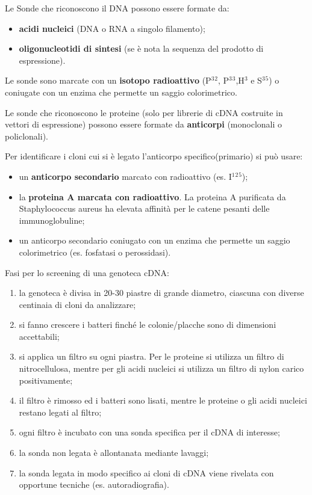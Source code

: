 \documentclass[11pt]{book}
\begin{document}
Le Sonde che riconoscono il DNA possono essere formate da:

\begin{itemize}
\itemsep1pt\parskip0pt
\item
  \textbf{acidi nucleici} (DNA o RNA a singolo filamento);
\item
  \textbf{oligonucleotidi di sintesi} (se è nota la sequenza del
  prodotto di espressione).
\end{itemize}

Le sonde sono marcate con un \textbf{isotopo radioattivo}
(P\(^3\)\(^2\), P\(^3\)\(^3\),H\(^3\) e S\(^3\)\(^5\)) o coniugate con
un enzima che permette un saggio colorimetrico.

Le sonde che riconoscono le proteine (solo per librerie di cDNA
costruite in vettori di espressione) possono essere formate da
\textbf{anticorpi} (monoclonali o policlonali).

Per identificare i cloni cui si è legato l'anticorpo specifico(primario)
si può usare:

\begin{itemize}
\itemsep1pt\parskip0pt
\item
  un \textbf{anticorpo secondario} marcato con radioattivo (es.
  I\(^1\)\(^2\)\(^5\));
\item
  la \textbf{proteina A marcata con radioattivo}. La proteina A
  purificata da Staphylococcus aureus ha elevata affinità per le catene
  pesanti delle immunoglobuline;
\item
  un anticorpo secondario coniugato con un enzima che permette un saggio
  colorimetrico (es. fosfatasi o perossidasi).
\end{itemize}

Fasi per lo screening di una genoteca cDNA:

\begin{enumerate}
\def\labelenumi{\arabic{enumi}.}
\itemsep1pt\parskip0pt
\item
  la genoteca è divisa in 20-30 piastre di grande diametro, ciascuna con
  diverse centinaia di cloni da analizzare;
\item
  si fanno crescere i batteri finché le colonie/placche sono di
  dimensioni accettabili;
\item
  si applica un filtro su ogni piastra. Per le proteine si utilizza un
  filtro di nitrocellulosa, mentre per gli acidi nucleici si utilizza un
  filtro di nylon carico positivamente;
\item
  il filtro è rimosso ed i batteri sono lisati, mentre le proteine o gli
  acidi nucleici restano legati al filtro;
\item
  ogni filtro è incubato con una sonda specifica per il cDNA di
  interesse;
\item
  la sonda non legata è allontanata mediante lavaggi;
\item
  la sonda legata in modo specifico ai cloni di cDNA viene rivelata con
  opportune tecniche (es. autoradiografia).
\end{enumerate}
\end{document}
